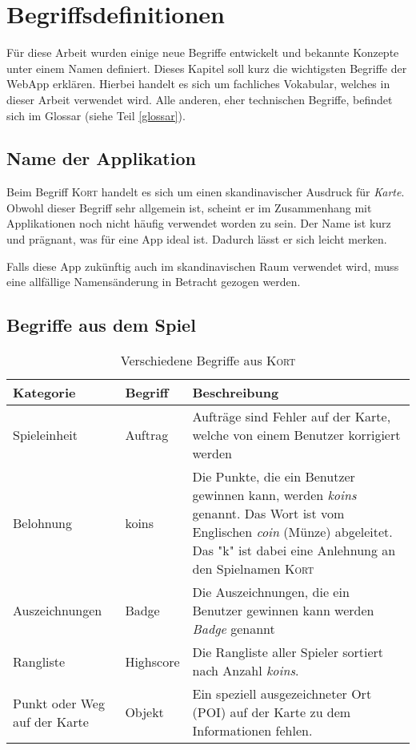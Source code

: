 \chapter{Begriffsdefinitionen}
\label{kort-definitionen}

Für diese Arbeit wurden einige neue Begriffe entwickelt und bekannte Konzepte unter einem Namen definiert.
Dieses Kapitel soll kurz die wichtigsten Begriffe der \gls{WebApp} erklären.
Hierbei handelt es sich um fachliches Vokabular, welches in dieser Arbeit verwendet wird.
Alle anderen, eher technischen Begriffe, befindet sich im Glossar (siehe Teil \ref{glossar}).

\section{Name der Applikation}
Beim Begriff \textsc{Kort} handelt es sich um einen skandinavischer Ausdruck für \emph{Karte}.
Obwohl dieser Begriff sehr allgemein ist, scheint er im Zusammenhang mit Applikationen noch nicht häufig verwendet worden zu sein.
Der Name ist kurz und prägnant, was für eine App ideal ist.
Dadurch lässt er sich leicht merken.

Falls diese App zukünftig auch im skandinavischen Raum verwendet wird, muss eine allfällige Namensänderung in Betracht gezogen werden.

\section{Begriffe aus dem Spiel}

\begin{table}[H]
\centering
\begin{tabular}{|p{0.2\threecelltabwidth}|p{0.2\threecelltabwidth}|p{0.6\threecelltabwidth}|}
\hline 
\small{\textbf{Kategorie}} & \small{\textbf{Begriff}} & \small{\textbf{Beschreibung}} \\
\hline 
Spieleinheit & Auftrag & Aufträge sind Fehler auf der Karte, welche von einem Benutzer korrigiert werden \\
\hline 
Belohnung & koins & Die Punkte, die ein Benutzer gewinnen kann, werden \emph{koins} genannt.
Das Wort ist vom Englischen \emph{coin} (Münze) abgeleitet. 
Das "k" ist dabei eine Anlehnung an den Spielnamen \textsc{Kort} \\
\hline 
Auszeichnungen & Badge & Die Auszeichnungen, die ein Benutzer gewinnen kann werden \emph{Badge} genannt \\
\hline 
Rangliste & Highscore & Die Rangliste aller Spieler sortiert nach Anzahl \emph{koins}. \\
\hline 
Punkt oder Weg auf der Karte & Objekt & Ein speziell ausgezeichneter Ort (\gls{POI}) auf der Karte zu dem Informationen fehlen. \\
\hline 
\end{tabular}
\caption{Verschiedene Begriffe aus \textsc{Kort}}
\label{table-definitionen}
\end{table}

